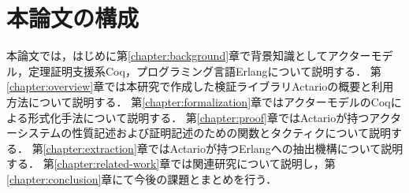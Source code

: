 \section{本論文の構成}
本論文では，はじめに第\ref{chapter:background}章で背景知識としてアクターモデル，定理証明支援系Coq，プログラミング言語Erlangについて説明する．
第\ref{chapter:overview}章では本研究で作成した検証ライブラリActarioの概要と利用方法について説明する．
第\ref{chapter:formalization}章ではアクターモデルのCoqによる形式化手法について説明する．
第\ref{chapter:proof}章ではActarioが持つアクターシステムの性質記述および証明記述のための関数とタクティクについて説明する．
第\ref{chapter:extraction}章ではActarioが持つErlangへの抽出機構について説明する．
第\ref{chapter:related-work}章では関連研究について説明し，第\ref{chapter:conclusion}章にて今後の課題とまとめを行う．
